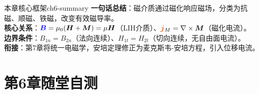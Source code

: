 \documentclass[11pt,a4paper,openany,oneside]{book}
\newcommand{\vecB}{\textcolor{blue}{\vect{B}}}
\newcommand{\vecJ}{\textcolor{cororange}{\vect{j}}}
\newcommand{\vect}[1]{\bm{#1}}
\newcommand{\curl}{\nabla\times}
\begin{document}
\begin{tip}{本章核心框架}{ch6-summary}
\textbf{一句话总结}：磁介质通过磁化响应磁场，分类为抗磁、顺磁、铁磁，改变有效磁导率。\\
\textbf{核心关系}：$\vecB=\mu_0(\vect{H}+\vect{M})=\mu\vect{H}$（LIH介质）、$\vecJ_M=\curl\vect{M}$（磁化电流）。\\
\textbf{边界条件}：$B_{1n}=B_{2n}$（法向连续）、$H_{1t}=H_{2t}$（切向连续，无自由面电流）。\\
\textbf{衔接}：第7章将统一电磁学，安培定理修正为麦克斯韦-安培方程，引入位移电流。
\end{tip}

\section*{第6章随堂自测}
\end{document}
